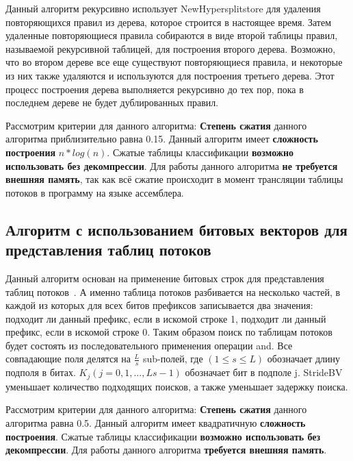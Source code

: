 \documentclass[a4paper, 12pt, titlepage, finall]{extreport}
\begin{document}
            Данный алгоритм рекурсивно использует NewHypersplitstore для удаления повторяющихся правил из дерева, которое строится в настоящее время. 
            Затем удаленные повторяющиеся правила собираются в виде второй таблицы правил, называемой рекурсивной таблицей, для построения второго дерева. 
            Возможно, что во втором дереве  все еще существуют повторяющиеся правила, и некоторые из них также удаляются и используются для построения третьего дерева. 
            Этот процесс построения дерева выполняется рекурсивно до тех пор, пока в последнем дереве не будет дублированных правил. 

            Рассмотрим критерии для данного алгоритма: \textbf{Степень сжатия} данного алгоритма приблизительно равна 0.15.
            Данный алгоритм имеет \textbf{сложность построения} \(n*log(n)\). Сжатые таблицы классификации \textbf{возможно использовать без декомпрессии}.
            Для работы данного алгоритма \textbf{не требуется внешняя память}, так как всё сжатие происходит в момент трансляции таблицы потоков в
            программу на языке ассемблера.
        \subsection{Алгоритм с использованием битовых векторов для представления таблиц потоков}
            Данный алгоритм основан на применение битовых строк для представления таблиц потоков~\cite{shi2020msbv}. А именно таблица потоков разбивается на несколько частей,
            в каждой из которых для всех битов префиксов записывается два значения: подходит ли данный префикс, если в искомой строке 1, 
            подходит ли данный префикс, если в искомой строке 0. Таким образом поиск по таблицам потоков будет состоять из последовательного применения 
            операции and.
            Все совпадающие поля делятся на \(\frac{L}{s}\) sub-полей, где \((1 ≤ s ≤ L)\) обозначает длину подполя в битах. 
            \(K_j (j = 0,1, ..., Ls − 1)\) обозначает бит в подполе j. StrideBV уменьшает количество подходящих поисков, 
            а также уменьшает задержку поиска.             

            Рассмотрим критерии для данного алгоритма: \textbf{Степень сжатия} данного алгоритма равна 0.5.
            Данный алгоритм имеет квадратичную \textbf{сложность построения}. Сжатые таблицы классификации \textbf{возможно использовать без декомпрессии}.
            Для работы данного алгоритма \textbf{требуется внешняя память}.
\end{document}
